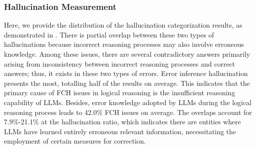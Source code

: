 


\subsubsection{Hallucination Measurement} 
Here, we provide the distribution of the hallucination categorization results, as demonstrated in . There is partial overlap between these two types of hallucinations because incorrect reasoning processes may also involve erroneous knowledge. Among these issues, there are several contradictory answers primarily arising from inconsistency between incorrect reasoning processes and correct answers; thus, it exists in these two types of errors. Error inference hallucination presents the most, totalling half of the results on average. 
This indicates that the primary cause of FCH issues in logical reasoning is the insufficient reasoning capability of LLMs.
Besides, error knowledge adopted by LLMs during the logical reasoning process leads to 42.0\% %
FCH issues on average. The overlaps account for 7.9\%-21.1\% at the hallucination ratio, which indicates there are entities where LLMs have learned entirely erroneous relevant information, necessitating the employment of certain measures for correction.

